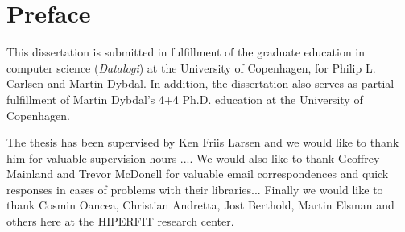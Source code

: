 \chapter{Preface}
This dissertation is submitted in fulfillment of the graduate education
in computer science (\textit{Datalogi}) at the University of
Copenhagen, for Philip L. Carlsen and Martin Dybdal. In addition, the
dissertation also serves as partial fulfillment of Martin Dybdal's 4+4
Ph.D. education at the University of Copenhagen.

The thesis has been supervised by Ken Friis Larsen and we would like
to thank him for valuable supervision hours .... We would also like to
thank Geoffrey Mainland and Trevor McDonell for valuable email
correspondences and quick responses in cases of problems with their
libraries... Finally we would like to thank Cosmin Oancea, Christian
Andretta, Jost Berthold, Martin Elsman and others here at the HIPERFIT
research center.
